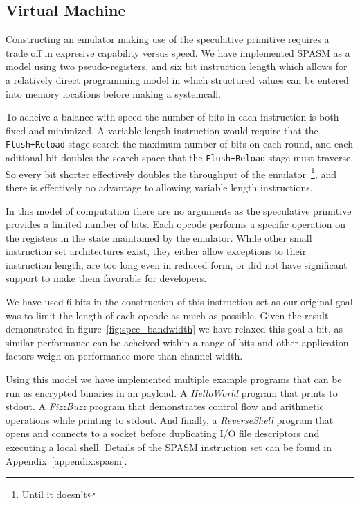 \FigSpecBandwidth

\subsection{Virtual Machine}
\label{subsec:spasm}

Constructing an emulator making use of the speculative primitive requires  
a trade off in expresive capability versus speed. 
We have implemented SPASM as a model using two pseudo-registers, and six 
bit instruction length which allows for a relatively direct programming model 
in which structured values can be entered into memory locations before making 
a systemcall.

To acheive a balance with speed the number of bits in each instruction is both 
fixed and minimized.  A variable length instruction would require that the 
\texttt{Flush+Reload} stage search the maximum number of bits on each round, and each 
aditional bit doubles the search space that the \texttt{Flush+Reload} stage must 
traverse.  So every bit shorter effectively doubles the throughput of the emulator~\footnote{Until it doesn't}, 
and there is effectively no advantage to allowing variable length 
instructions. 

In this model of computation there are no arguments as the speculative 
primitive provides a limited number of bits. Each opcode performs a 
specific operation on the registers in the state maintained by the emulator.
While other small instruction set architectures exist, they either allow 
exceptions to their instruction length, are too long even in reduced form, 
or did not have significant support to make them favorable for developers. 

We have used 6 bits in the construction of this instruction set as our original
goal was to limit the length of each opcode as much as possible. Given the result 
demonstrated in figure~\ref{fig:spec_bandwidth} we have relaxed this goal a bit, as similar 
performance can be acheived within a range of bits and other application 
factors weigh on performance more than channel width. 

Using this model we have implemented multiple example programs that can be run
as encrypted binaries in an \speculake payload. A \textit{HelloWorld} program 
that prints to stdout. A \textit{FizzBuzz} program that demonstrates control 
flow and arithmetic operations while printing to stdout. And finally,
a \textit{ReverseShell} program that opens and connects to a socket before  
duplicating I/O file descriptors and executing a local shell. Details of the 
SPASM instruction set can be found in Appendix~\ref{appendix:spasm}.

